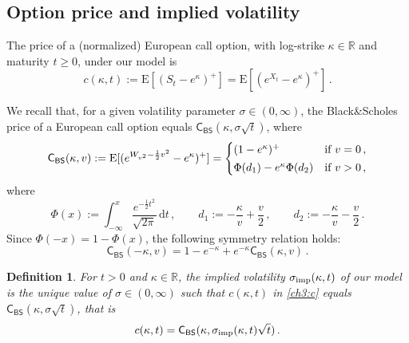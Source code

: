 \documentclass[a4paper,reqno,11pt]{amsart}
\numberwithin{equation}{section}
\newtheorem{definition}[theorem]{Definition}
\newcommand{\dd}{\text{\rm d}}             %
\newcommand{\R}{\mathbb{R}}
\newcommand{\PEfont}{\mathrm}
\newcommand{\E}{\ensuremath{\PEfont E}}
\def\dd{\mathrm{d}}
\newcommand\CBS{\mathsf{C_{BS}}}
\begin{document}
\subsection{Option price and implied volatility}
\label{ch:sec:opiv}

The price of a (normalized) European call option, with log-strike $\kappa \in \R$
and maturity $t \ge 0$, under our model is
\begin{equation} \label{ch3:c}
	c(\kappa,t) := \E[(S_t - e^\kappa)^+] = \E[(e^{X_t}-e^{\kappa})^+] \,.
\end{equation}

We recall that, for a given volatility parameter $\sigma \in (0,\infty)$, 
the Black\&Scholes price of a European call option
equals $\CBS(\kappa,\sigma \sqrt{t})$, where
\begin{equation} \label{ch3:eq:BS1}
	\CBS(\kappa,v) 
	:= \E [ (e^{W_{v^2} - \frac{1}{2} v^2} - e^{\kappa})^+ ]
	= \begin{cases}
	(1-e^\kappa)^+ & \text{if } v = 0 \,, \\
	\rule{0pt}{1.2em}\Phi(d_1) - e^\kappa \Phi(d_2)  & \text{if } v > 0 \,,
	\end{cases}
\end{equation}
where
\begin{equation} \label{ch3:eq:BS2}
	\Phi(x) := \int_{-\infty}^x \frac{e^{-\frac{1}{2} t^2}}{\sqrt{2\pi}} \, \dd t \,, \qquad
	d_1 := - \frac{\kappa}{v} + \frac{v}{2} \,, \qquad
	d_2 := - \frac{\kappa}{v} - \frac{v}{2} \,.
\end{equation}
Since $\Phi(-x) = 1-\Phi(x)$, the following symmetry relation holds:
\begin{equation}\label{ch3:eq:symBS}
	\CBS(-\kappa,v) = 1-e^{-\kappa} + e^{-\kappa} \CBS(\kappa,v) \,.
\end{equation}

\begin{definition}\label{ch3:def:iv}
For $t > 0$ and $\kappa\in\R$,
the \emph{implied volatility} $\sigma_{\rm imp}(\kappa,t)$
of our model is
the unique value of $\sigma\in (0,\infty)$ such that $c(\kappa,t)$ in \eqref{ch3:c} equals
$\CBS(\kappa, \sigma\sqrt{t})$, that is
\begin{equation} \label{ch3:eq:IV}
	c(\kappa,t) = \CBS(\kappa, \sigma_{\rm imp}(\kappa,t) \sqrt{t}) \,.
\end{equation}
\end{definition}
\end{document}
